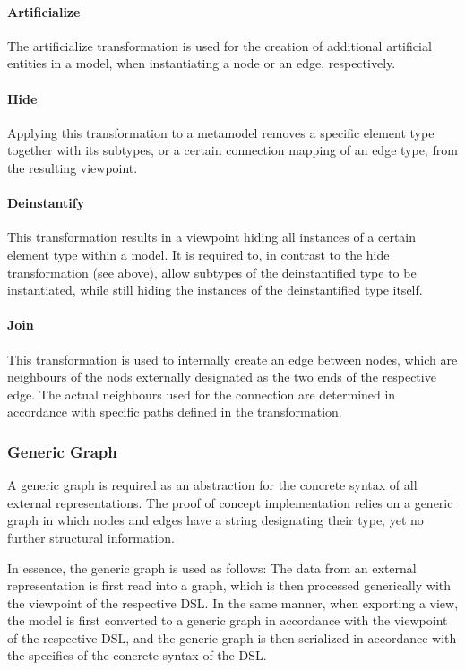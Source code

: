 \paragraph{Artificialize} The artificialize transformation is used for the creation of additional artificial entities in a model, when instantiating a node or an edge, respectively.

\paragraph{Hide} Applying this transformation to a metamodel removes a specific element type together with its subtypes, or a certain connection mapping of an edge type, from the resulting viewpoint.

\paragraph{Deinstantify} This transformation results in a viewpoint hiding all instances of a certain element type within a model. It is required to, in contrast to the hide transformation (see above), allow subtypes of the deinstantified type to be instantiated, while still hiding the instances of the deinstantified type itself.

\paragraph{Join} This transformation is used to internally create an edge between nodes, which are neighbours of the nods externally designated as the two ends of the respective edge. The actual neighbours used for the connection are determined in accordance with specific paths defined in the transformation.

\subsubsection{Generic Graph}

A generic graph is required as an abstraction for the concrete syntax of all external representations. The proof of concept implementation relies on a generic graph in which nodes and edges have a string designating their type, yet no further structural information.

In essence, the generic graph is used as follows: The data from an external representation is first read into a graph, which is then processed generically with the viewpoint of the respective DSL. In the same manner, when exporting a view, the model is first converted to a generic graph in accordance with the viewpoint of the respective DSL, and the generic graph is then serialized in accordance with the specifics of the concrete syntax of the DSL.

